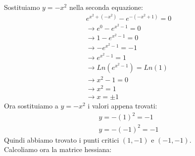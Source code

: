 \documentclass{article}
\begin{document}
Sostituiamo $y=-x^2$ nella seconda equazione:
\begin{align*}
    e^{x^2+(-x^2)}-e^{-(-x^2+1)}=0 \\
    \to e^{0}-e^{x^2-1}=0 \\
    \to 1-e^{x^2-1}=0 \\
    \to -e^{x^2-1}=-1 \\
    \to e^{x^2-1}=1 \\
    \to Ln(e^{x^2-1})=Ln(1) \\
    \to x^2-1=0 \\
    \to x^2=1 \\
    \to x=\pm 1
\end{align*}
Ora sostituiamo a $y=-x^2$ i valori appena trovati:
\begin{align*}
    y=-(1)^2=-1 \\
    y=-(-1)^2=-1
\end{align*}
Quindi abbiamo trovato i punti critici $(1,-1)$ e $(-1,-1)$. \\
Calcoliamo ora la matrice hessiana:
\end{document}
